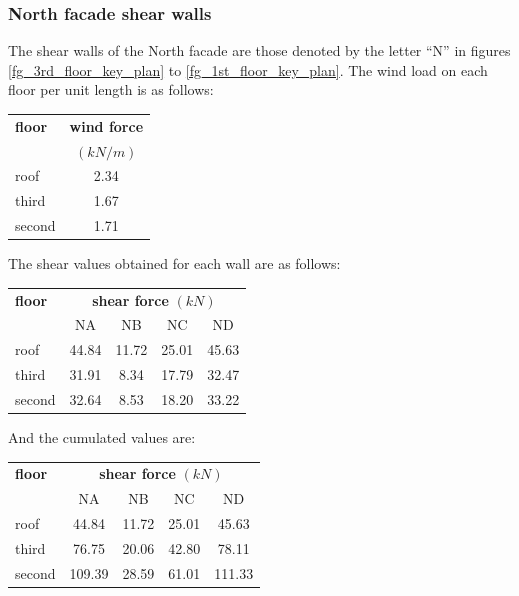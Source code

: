 \subsubsection{North facade shear walls}
The shear walls of the North facade are those denoted by the letter ``N'' in figures \ref{fg_3rd_floor_key_plan} to \ref{fg_1st_floor_key_plan}. The wind load on each floor per unit length is as follows:


\begin{center}
  \begin{tabular}{|l|c|}
    \hline
    \textbf{floor} & \textbf{wind force}\\
    & $(kN/m)$\\
    \hline
    roof & 2.34 \\
    third & 1.67 \\
    second & 1.71 \\
    \hline
  \end{tabular}
\end{center}

\noindent The shear values obtained for each wall are as follows:

\begin{center}
  \begin{tabular}{|l|c|c|c|c|}
    \hline
    \textbf{floor} & \multicolumn{4}{c|}{\textbf{shear force} $(kN)$}\\
                   & NA & NB & NC & ND \\
    \hline
    roof & 44.84 & 11.72 & 25.01 & 45.63 \\
    third & 31.91 & 8.34 & 17.79 & 32.47 \\
    second & 32.64 & 8.53 & 18.20 & 33.22 \\
    \hline
  \end{tabular}
\end{center}  

\noindent And the cumulated values are:

\begin{center}
  \begin{tabular}{|l|c|c|c|c|}
    \hline
    \textbf{floor} & \multicolumn{4}{c|}{\textbf{shear force} $(kN)$}\\
                   & NA & NB & NC & ND \\
    \hline
    roof & 44.84 & 11.72 & 25.01 & 45.63 \\
    third & 76.75 & 20.06 & 42.80 & 78.11 \\
    second & 109.39 & 28.59 & 61.01 & 111.33 \\
    \hline
  \end{tabular}
\end{center}  

